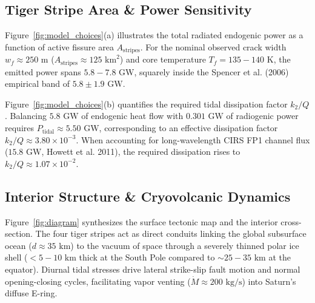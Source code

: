 \documentclass[10pt,twocolumn,a4paper]{article}
\begin{document}
\subsection{Tiger Stripe Area \& Power Sensitivity}
Figure~\ref{fig:model_choices}(a) illustrates the total radiated endogenic power as a function of active fissure area $A_{\text{stripes}}$. For the nominal observed crack width $w_f \approx 250\text{ m}$ ($A_{\text{stripes}} \approx 125\text{ km}^2$) and core temperature $T_f = 135-140\text{ K}$, the emitted power spans $5.8-7.8\text{ GW}$, squarely inside the Spencer et al. (2006) empirical band of $5.8 \pm 1.9\text{ GW}$.

Figure~\ref{fig:model_choices}(b) quantifies the required tidal dissipation factor $k_2/Q$. Balancing $5.8\text{ GW}$ of endogenic heat flow with $0.301\text{ GW}$ of radiogenic power requires $P_{\text{tidal}} \approx 5.50\text{ GW}$, corresponding to an effective dissipation factor $k_2/Q \approx 3.80 \times 10^{-3}$. When accounting for long-wavelength CIRS FP1 channel flux ($15.8\text{ GW}$, Howett et al. 2011), the required dissipation rises to $k_2/Q \approx 1.07 \times 10^{-2}$.

\subsection{Interior Structure \& Cryovolcanic Dynamics}
Figure~\ref{fig:diagram} synthesizes the surface tectonic map and the interior cross-section. The four tiger stripes act as direct conduits linking the global subsurface ocean ($d \approx 35\text{ km}$) to the vacuum of space through a severely thinned polar ice shell ($<5-10\text{ km}$ thick at the South Pole compared to $\sim 25-35\text{ km}$ at the equator). Diurnal tidal stresses drive lateral strike-slip fault motion and normal opening-closing cycles, facilitating vapor venting ($\dot{M} \approx 200\text{ kg/s}$) into Saturn's diffuse E-ring.
\end{document}
